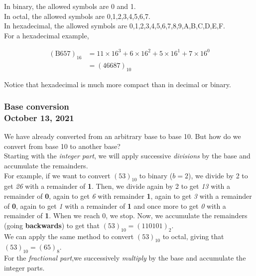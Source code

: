 \documentclass[]{article}
\begin{document}
In binary, the allowed symbols are 0 and 1.\\
In octal, the allowed symbols are 0,1,2,3,4,5,6,7.\\
In hexadecimal, the allowed symbols are 0,1,2,3,4,5,6,7,8,9,A,B,C,D,E,F.\\

For a hexadecimal example,

\begin{align*}
	(\mathrm{B657})_{16} &= 11 \times 16^3 + 6 \times 16^2 + 5 \times 16^1 + 7 \times 16^0 \\
	&= (46687)_{10}
\end{align*}\bigbreak

Notice that hexadecimal is much more compact than in decimal or binary.\\


\subsubsection{Base conversion\\ {\normalfont October 13, 2021}}
\bigbreak

We have already converted from an arbitrary base to base 10. But how do we convert from base 10 to another base?\\

Starting with the \textit{integer part}, we will apply successive \textit{divisions} by the base and accumulate the remainders. \\

For example, if we want to convert $(53)_{10}$ to binary ($b=2$), we divide by 2 to get \textit{26} with a remainder of \textbf{1}. Then, we divide again by 2 to get \textit{13} with a remainder of \textbf{0}, again to get \textit{6} with remainder \textbf{1}, again to get \textit{3} with a remainder of \textbf{0}, again to get \textit{1} with a remainder of \textbf{1} and once more to get \textit{0} with a remainder of \textbf{1}. When we reach 0, we stop. Now, we accumulate the remainders (going \textbf{backwards}) to get that $(53)_{10} = (110101)_2$.\\

We can apply the same method to convert $(53)_{10}$ to octal, giving that $(53)_{10} = (65)_8$.\\

For the \textit{fractional part},we successively \textit{multiply} by the base and accumulate the integer parts.\\
\end{document}
